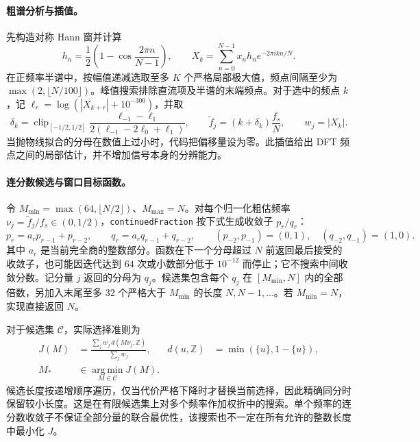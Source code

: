 \paragraph{粗谱分析与插值。}
先构造对称 Hann 窗并计算
\[
h_n=\frac12\left(1-\cos\frac{2\pi n}{N-1}\right),\qquad
X_k=\sum_{n=0}^{N-1}x_nh_n e^{-2\pi i kn/N}.
\]
在正频率半谱中，按幅值递减选取至多 \(K\) 个严格局部极大值，频点间隔至少为 \(\max(2,\lfloor N/100\rfloor)\)。峰值搜索排除直流项及半谱的末端频点。对于选中的频点 \(k\)，记 \(\ell_r=\log(|X_{k+r}|+10^{-300})\)，并取
\[
\delta_k=\operatorname{clip}_{[-1/2,1/2]}
 \frac{\ell_{-1}-\ell_{1}}{2(\ell_{-1}-2\ell_0+\ell_1)},
\qquad
\widetilde f_j=(k+\delta_k)\frac{f_s}{N},\qquad w_j=|X_k|.
\]
当抛物线拟合的分母在数值上过小时，代码把偏移量设为零。此插值给出 DFT 频点之间的局部估计，并不增加信号本身的分辨能力。

\paragraph{连分数候选与窗口目标函数。}
令 \(M_{\min}=\max(64,\lfloor N/2\rfloor)\)、\(M_{\max}=N\)。对每个归一化粗估频率 \(\nu_j=\widetilde f_j/f_s\in(0,1/2)\)，\texttt{continuedFraction} 按下式生成收敛子 \(p_r/q_r\)：
\[
p_r=a_rp_{r-1}+p_{r-2},\qquad
q_r=a_rq_{r-1}+q_{r-2},\qquad
(p_{-2},p_{-1})=(0,1),\quad(q_{-2},q_{-1})=(1,0).
\]
其中 \(a_r\) 是当前完全商的整数部分。函数在下一个分母超过 \(N\) 前返回最后接受的收敛子，也可能因迭代达到 \(64\) 次或小数部分低于 \(10^{-12}\) 而停止；它不搜索中间收敛分数。记分量 \(j\) 返回的分母为 \(q_j\)。候选集包含每个 \(q_j\) 在 \([M_{\min},N]\) 内的全部倍数，另加入末尾至多 \(32\) 个严格大于 \(M_{\min}\) 的长度 \(N,N-1,\ldots\)。若 \(M_{\min}=N\)，实现直接返回 \(N\)。

对于候选集 \(\mathcal C\)，实际选择准则为
\begin{equation}\label{eq:calendar_leap_window_cost}
\begin{aligned}
J(M)&=\frac{\sum_j w_j\,d(M\nu_j,\mathbb Z)}{\sum_j w_j},
& d(u,\mathbb Z)&=\min(\{u\},1-\{u\}),\\
M_*&\in\underset{M\in\mathcal C}{\operatorname{arg\,min}}J(M).
\end{aligned}
\end{equation}
候选长度按递增顺序遍历，仅当代价严格下降时才替换当前选择，因此精确同分时保留较小长度。这是在有限候选集上对多个频率作加权折中的搜索。单个频率的连分数收敛子不保证全部分量的联合最优性，该搜索也不一定在所有允许的整数长度中最小化 \(J\)。


